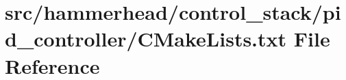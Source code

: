 \hypertarget{control__stack_2pid__controller_2CMakeLists_8txt}{}\section{src/hammerhead/control\+\_\+stack/pid\+\_\+controller/\+C\+Make\+Lists.txt File Reference}
\label{control__stack_2pid__controller_2CMakeLists_8txt}
